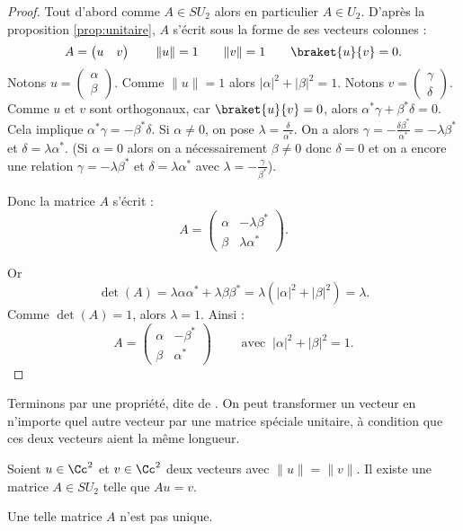 \documentclass[11pt,class=report,crop=false]{standalone}
\begin{document}
\begin{proof}
Tout d'abord comme $A \in SU_2$ alors en particulier $A \in U_2$.
D'après la proposition \ref{prop:unitaire},
$A$ s'écrit sous la forme de ses vecteurs colonnes :
$$A = \begin{pmatrix}u & v\end{pmatrix}\qquad
\|u\|=1 \qquad \|v\|=1 \qquad \braket{u}{v} = 0.$$
Notons $u = \begin{pmatrix}\alpha\\\beta\end{pmatrix}$. 
Comme $\|u\|=1$ alors $|\alpha|^2 + |\beta|^2 = 1$.
Notons $v = \begin{pmatrix}\gamma\\\delta\end{pmatrix}$. 
Comme $u$ et $v$ sont orthogonaux, car $\braket{u}{v} = 0$,
alors $\alpha^* \gamma + \beta^*\delta=0$.
Cela implique $\alpha^* \gamma = -\beta^*\delta$.
Si $\alpha\neq0$, on pose $\lambda = \frac{\delta}{\alpha^*}$. 
On a alors $\gamma = - \frac{\delta\beta^*}{\alpha^*} = - \lambda \beta^*$ et $\delta = \lambda \alpha^*$. (Si $\alpha = 0$ alors on a nécessairement $\beta\neq0$ donc $\delta=0$ et on a encore une relation $\gamma = - \lambda \beta^*$ et $\delta = \lambda \alpha^*$ avec $\lambda = - \frac{\gamma}{\beta^*}$).

Donc la matrice $A$ s'écrit :
$$A = \begin{pmatrix}\alpha&-\lambda\beta^*\\\beta&\lambda\alpha^*\end{pmatrix}.$$

Or 
$$\det(A) = \lambda \alpha\alpha^* + \lambda\beta\beta^*
= \lambda ( |\alpha|^2 + |\beta|^2 ) = \lambda.$$
Comme $\det(A)=1$, alors $\lambda=1$.
Ainsi :
$$A = \begin{pmatrix}\alpha&-\beta^*\\\beta&\alpha^*\end{pmatrix}
\qquad \text{ avec }  \ |\alpha|^2 + |\beta|^2 = 1.$$
\end{proof}






Terminons par une propriété, dite de . On peut transformer un vecteur en n'importe quel autre vecteur par une matrice spéciale unitaire, à condition que ces deux vecteurs aient la même longueur.
\begin{proposition}
Soient $u \in \Cc^2$ et $v \in \Cc^2$ deux vecteurs avec $\|u\|=\|v\|$.
Il existe une matrice $A \in SU_2$ telle que $Au=v$.
\end{proposition}
Une telle matrice $A$ n'est pas unique.
\end{document}
